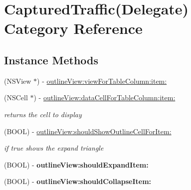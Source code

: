 \hypertarget{category_captured_traffic_07_delegate_08}{}\section{Captured\+Traffic(Delegate) Category Reference}
\label{category_captured_traffic_07_delegate_08}
\subsection*{Instance Methods}
\begin{DoxyCompactItemize}
\item 
(N\+S\+View $\ast$) -\/ \hyperlink{category_captured_traffic_07_delegate_08_a819263857354e5b56f58dbe5995aaf8c}{outline\+View\+:view\+For\+Table\+Column\+:item\+:}
\item 
\mbox{\label{category_captured_traffic_07_delegate_08_afb2e31d71090a37c29453ae53633c0e8}} 
(N\+S\+Cell $\ast$) -\/ \hyperlink{category_captured_traffic_07_delegate_08_afb2e31d71090a37c29453ae53633c0e8}{outline\+View\+:data\+Cell\+For\+Table\+Column\+:item\+:}
\begin{DoxyCompactList}\small\item\em returns the cell to display \end{DoxyCompactList}\item 
\mbox{\label{category_captured_traffic_07_delegate_08_aa8f74331f08776a7ff30a6cad7f48783}} 
(B\+O\+OL) -\/ \hyperlink{category_captured_traffic_07_delegate_08_aa8f74331f08776a7ff30a6cad7f48783}{outline\+View\+:should\+Show\+Outline\+Cell\+For\+Item\+:}
\begin{DoxyCompactList}\small\item\em if true shows the expand triangle \end{DoxyCompactList}\item 
\mbox{\label{category_captured_traffic_07_delegate_08_a4615e3cad4f8a4b7443096c1180cd791}} 
(B\+O\+OL) -\/ {\bfseries outline\+View\+:should\+Expand\+Item\+:}
\item 
\mbox{\label{category_captured_traffic_07_delegate_08_a2a48a763f58d06e0d0f76b4fc25cbd68}} 
(B\+O\+OL) -\/ {\bfseries outline\+View\+:should\+Collapse\+Item\+:}

\end{DoxyCompactItemize}
